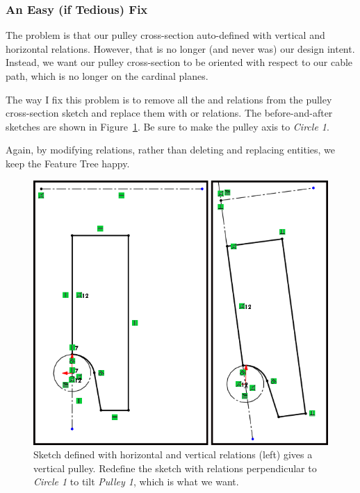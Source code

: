 \subsubsection{An Easy (if Tedious) Fix}

The problem is that our pulley cross-section auto-defined with vertical and
horizontal relations. However, that is no longer (and never was) our design intent.
Instead, we want our pulley cross-section to be oriented with respect to our
cable path, which is no longer on the cardinal planes.

The way I fix this problem is to remove all the  and
 relations from the pulley cross-section sketch and replace them with
 or  relations. The before-and-after
sketches are shown in Figure~\ref{fig:tilt-pulley-relations}. Be sure to make
the pulley axis  to \emph{Circle 1}.

Again, by modifying
relations, rather than deleting and replacing entities, we keep the Feature Tree
happy.

\begin{figure}[H]
\begin{center}
\includegraphics{images/figures/tilt-pulley-relations.png}
\end{center}
\caption{Sketch defined with horizontal and vertical relations (left) gives a vertical
  pulley. Redefine the sketch with relations perpendicular to \emph{Circle 1} to tilt
  \emph{Pulley 1}, which is what we want.
\label{fig:tilt-pulley-relations}}

\end{figure}

